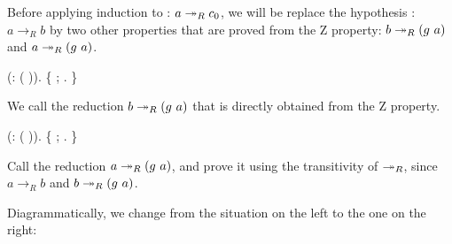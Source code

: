     Before applying induction to : $a \twoheadrightarrow_R c_0$, we will be
    replace the hypothesis : $a\to_R b$ by two other properties
    that are proved from the Z property: $b\tto_R (g\ a)$ and $a\twoheadrightarrow_R
    (g\ a)$. \begin{coqdoccode}
\coqdocemptyline
\coqdocindent{2.00em}
 (:    ( )).\coqdoceol
\coqdocindent{2.00em}
\{  ; . \} \end{coqdoccode}
We call  the reduction
    $b\tto_R (g\ a)$ that is directly obtained from the Z property. \begin{coqdoccode}
\coqdocnoindent
\coqdoceol
\coqdocindent{2.00em}
 (:    ( )).\coqdoceol
\coqdocindent{2.00em}
\{    ; . \} \end{coqdoccode}
Call  the
        reduction $a\twoheadrightarrow_R (g\ a)$, and prove it using the
        transitivity of $\twoheadrightarrow_R$, since $a \to_R b$ and $b \twoheadrightarrow_R (g\
        a)$.


        Diagrammatically, we change from the situation on the left to
        the one on the right:


